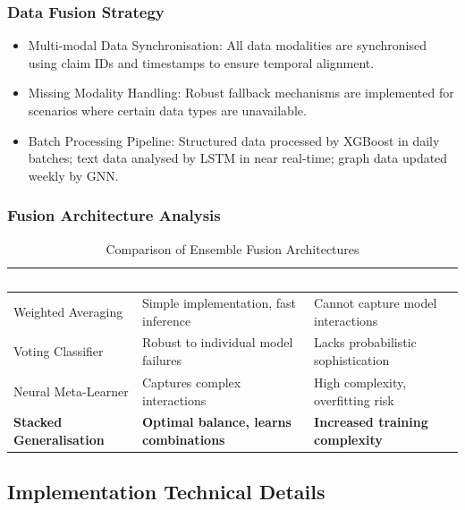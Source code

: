 \documentclass[12pt,a4paper,oneside]{report}
\numberwithin{equation}{chapter}
\renewcommand{\arraystretch}{1.6}
\begin{document}
\subsubsection{Data Fusion Strategy}

\begin{itemize}
    \item Multi-modal Data Synchronisation: All data modalities are synchronised using claim IDs and timestamps to ensure temporal alignment.
    \item Missing Modality Handling: Robust fallback mechanisms are implemented for scenarios where certain data types are unavailable.
    \item Batch Processing Pipeline: Structured data processed by XGBoost in daily batches; text data analysed by LSTM in near real-time; graph data updated weekly by GNN.
\end{itemize}

\subsubsection{Fusion Architecture Analysis}

\begin{table}[H]
\centering
\caption{Comparison of Ensemble Fusion Architectures}
\label{tab:fusion-architectures}
\renewcommand{\arraystretch}{1.4}
\begin{tabular}{L{3.5cm} L{5cm} L{5cm}}
\toprule
{}
\textcolor{white}{\textbf{Architecture}} &
\textcolor{white}{\textbf{Advantages}} &
\textcolor{white}{\textbf{Disadvantages}} \\
\midrule
{}
Weighted Averaging & Simple implementation, fast inference & Cannot capture model interactions \\
Voting Classifier & Robust to individual model failures & Lacks probabilistic sophistication \\
Neural Meta-Learner & Captures complex interactions & High complexity, overfitting risk \\
\textbf{Stacked Generalisation} & \textbf{Optimal balance, learns combinations} & \textbf{Increased training complexity} \\
\bottomrule
\end{tabular}
\end{table}

\subsection{Implementation Technical Details}
\label{subsec:implementation-details}
\end{document}

